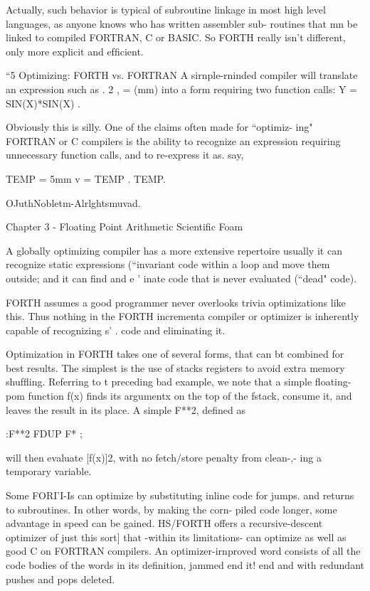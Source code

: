Actually, such behavior is typical of subroutine linkage in most high
level languages, as anyone knows who has written assembler sub-
routines that mn be linked to compiled FORTRAN, C or BASIC.
So FORTH really isn’t different, only more explicit and efﬁcient.

“5 Optimizing: FORTH vs. FORTRAN
A sirnple-rninded compiler will translate an expression such as
. 2
, = (mm)
into a form requiring two function calls:
Y = SIN(X)*SIN(X) .

Obviously this is silly. One of the claims often made for “optimiz-
ing" FORTRAN or C compilers is the ability to recognize an
expression requiring unnecessary function calls, and to re-express
it as. say,

TEMP = 5mm
v = TEMP . TEMP.

OJuthNobletm-Alrlghtsmuvad.

Chapter 3 - Floating Point Arithmetic Scientiﬁc Foam

 
    
   
  
  
 

A globally optimizing compiler has a more extensive repertoire
usually it can recognize static expressions (“invariant code
within a loop and move them outside; and it can find and e '
inate code that is never evaluated (“dead" code).

FORTH assumes a good programmer never overlooks trivia
optimizations like this. Thus nothing in the FORTH incrementa
compiler or optimizer is inherently capable of recognizing s' .
code and eliminating it.

Optimization in FORTH takes one of several forms, that can bt
combined for best results. The simplest is the use of stacks
registers to avoid extra memory shufﬂing. Referring to t
preceding bad example, we note that a simple ﬂoating-pom
function f(x) ﬁnds its argumentx on the top of the fstack, consume
it, and leaves the result in its place. A simple F**2, deﬁned as

:F**2 FDUP F* ;

will then evaluate [f(x)]2, with no fetch/store penalty from clean-,-
ing a temporary variable.

Some FORI'I-Is can optimize by substituting inline code for jumps.
and returns to subroutines. In other words, by making the corn-
piled code longer, some advantage in speed can be gained.
HS/FORTH offers a recursive-descent optimizer of just this sort]
that -within its limitations- can optimize as well as good C on
FORTRAN compilers. An optimizer-irnproved word consists of
all the code bodies of the words in its definition, jammed end it!
end and with redundant pushes and pops deleted.


